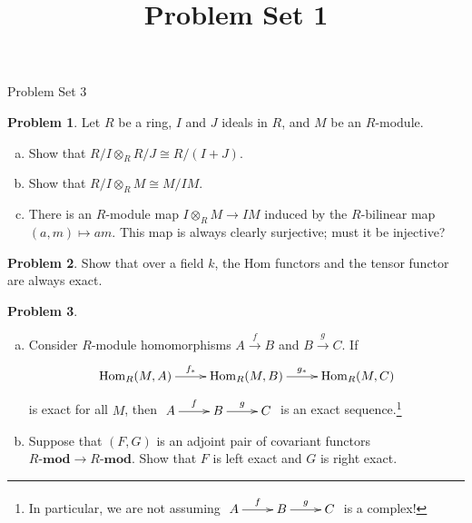 \documentclass[11pt]{article}
\title{}
\date{\vspace{-0.5in}}
\title{Problem Set 1}
\DeclareMathOperator{\Hom}{Hom}
\theoremstyle{definition}
\newtheorem{problem}{Problem}
\begin{document}
\thispagestyle{fancy}
\pagestyle{fancy}


\begin{center}
	{\LARGE Problem Set 3}
\end{center}



\begin{problem}
Let $R$ be a ring, $I$ and $J$ ideals in $R$, and $M$ be an $R$-module.
\begin{enumerate}[a)]
	\item Show that $R/I \otimes_R R/J \cong R/(I+J)$.
	\item Show that $R/I \otimes_R M \cong M/IM$.
	\item There is an $R$-module map $I \otimes_R M \longrightarrow IM$ induced by the $R$-bilinear map $(a,m) \mapsto am$. This map is always clearly surjective; must it be injective?
\end{enumerate}
\end{problem}

\vfill

\begin{problem}
	Show that over a field $k$, the Hom functors and the tensor functor are always exact.
\end{problem}



\vfill

\begin{problem}$\,$
	\begin{enumerate}[a)]
		\item Consider $R$-module homomorphisms $A \xrightarrow{f} B $ and $B \xrightarrow{g} C$. If
		$$\xymatrix{\Hom_R(M,A) \ar[r]^{f_*} & \Hom_R(M,B) \ar[r]^-{g_*} & \Hom_R(M,C)}$$
		is exact for all $M$, then $\xymatrix{A \ar[r]^-f & B \ar[r]^-g & C}$ is an exact sequence.\footnote{In particular, we are not assuming $\xymatrix{A \ar[r]^-f & B \ar[r]^-g & C}$ is a complex!}
		\item Suppose that $(F,G)$ is an adjoint pair of covariant functors $R\textbf{-mod} \longrightarrow R\textbf{-mod}$. Show that $F$ is left exact and $G$ is right exact.
	\end{enumerate}
\end{problem}



\vspace{2em}

\noindent
{} 
\end{document}
